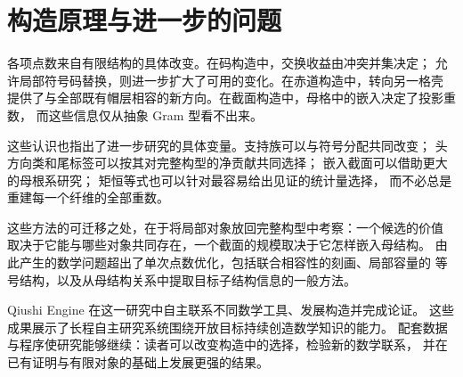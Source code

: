 \section{构造原理与进一步的问题}

各项点数来自有限结构的具体改变。在码构造中，交换收益由冲突并集决定；
允许局部符号码替换，则进一步扩大了可用的变化。在赤道构造中，转向另一格壳
提供了与全部既有帽层相容的新方向。在截面构造中，母格中的嵌入决定了投影重数，
而这些信息仅从抽象 Gram 型看不出来。

这些认识也指出了进一步研究的具体变量。支持族可以与符号分配共同改变；
头方向类和尾标签可以按其对完整构型的净贡献共同选择；
嵌入截面可以借助更大的母根系研究；
矩恒等式也可以针对最容易给出见证的统计量选择，
而不必总是重建每一个纤维的全部重数。

这些方法的可迁移之处，在于将局部对象放回完整构型中考察：一个候选的价值
取决于它能与哪些对象共同存在，一个截面的规模取决于它怎样嵌入母结构。
由此产生的数学问题超出了单次点数优化，包括联合相容性的刻画、局部容量的
等号结构，以及从母结构关系中提取目标子结构信息的一般方法。

Qiushi Engine 在这一研究中自主联系不同数学工具、发展构造并完成论证。
这些成果展示了长程自主研究系统围绕开放目标持续创造数学知识的能力。
配套数据与程序使研究能够继续：读者可以改变构造中的选择，检验新的数学联系，
并在已有证明与有限对象的基础上发展更强的结果。

